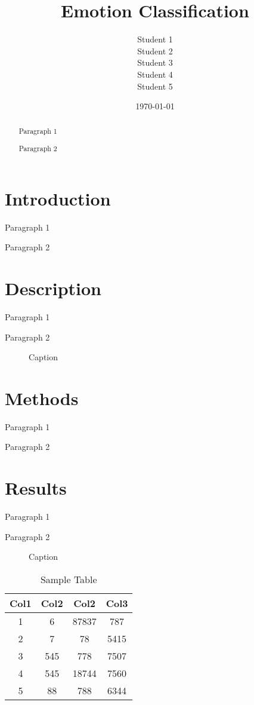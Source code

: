 \documentclass[12pt, a4paper]{report}
\title{Emotion Classification}
\author{Student 1 \\ Student 2 \\ Student 3 \\ Student 4 \\ Student 5}
\date{\today}
\begin{document}
\maketitle
\tableofcontents
\begin{abstract}
Paragraph 1

Paragraph 2
\end{abstract}

\section{Introduction}
Paragraph 1

Paragraph 2

\section{Description}
Paragraph 1

Paragraph 2

\begin{figure}[h]
    \centering
    \caption{Caption}
    \label{fig:mesh1}
\end{figure}

\section{Methods}
Paragraph 1

Paragraph 2

\section{Results}
Paragraph 1

Paragraph 2

\begin{figure}[h]
    \centering
    \caption{Caption}
    \label{fig:mesh1}
\end{figure}

\begin{table}[h]
\centering
\begin{tabular}{||c c c c||} 
 \hline
 Col1 & Col2 & Col2 & Col3 \\ [0.5ex] 
 \hline\hline
 1 & 6 & 87837 & 787 \\ 
 2 & 7 & 78 & 5415 \\
 3 & 545 & 778 & 7507 \\
 4 & 545 & 18744 & 7560 \\
 5 & 88 & 788 & 6344 \\ [1ex] 
 \hline
\end{tabular}
\caption{Sample Table}
\label{table:data}
\end{table}
\end{document}
